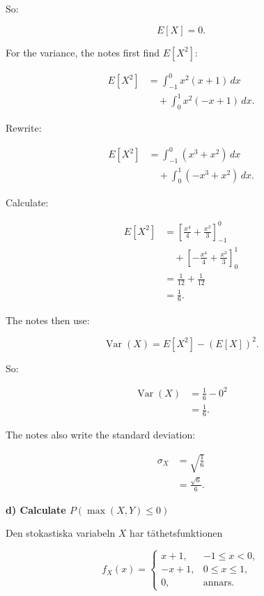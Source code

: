 \documentclass[10pt]{article}
\begin{document}
So:

\[
E[X]=0.
\]

For the variance, the notes first find \(E[X^2]\):

\begin{align*}
E[X^2]
&=
\int_{-1}^{0}x^2(x+1)\,dx \\
&\quad+
\int_{0}^{1}x^2(-x+1)\,dx.
\end{align*}

Rewrite:

\begin{align*}
E[X^2]
&=
\int_{-1}^{0}(x^3+x^2)\,dx \\
&\quad+
\int_{0}^{1}(-x^3+x^2)\,dx.
\end{align*}

Calculate:

\begin{align*}
E[X^2]
&=
\left[
\frac{x^4}{4}
+\frac{x^3}{3}
\right]_{-1}^{0} \\
&\quad+
\left[
-\frac{x^4}{4}
+\frac{x^3}{3}
\right]_{0}^{1} \\[2mm]
&=
\frac{1}{12}
+\frac{1}{12} \\[2mm]
&=
\frac{1}{6}.
\end{align*}

The notes then use:

\[
\operatorname{Var}(X)
=
E[X^2]-(E[X])^2.
\]

So:

\begin{align*}
\operatorname{Var}(X)
&=
\frac{1}{6}-0^2 \\[2mm]
&=
\frac{1}{6}.
\end{align*}

The notes also write the standard deviation:

\begin{align*}
\sigma_X
&=
\sqrt{\frac{1}{6}} \\[2mm]
&=
\frac{\sqrt{6}}{6}.
\end{align*}

\textbf{d) Calculate \(P(\max(X,Y)\le 0)\)}

Den stokastiska variabeln \(X\) har täthetsfunktionen

\[
f_X(x)=
\begin{cases}
x+1, & -1\le x<0,\\
-x+1, & 0\le x\le 1,\\
0, & \text{annars}.
\end{cases}
\]
\end{document}
